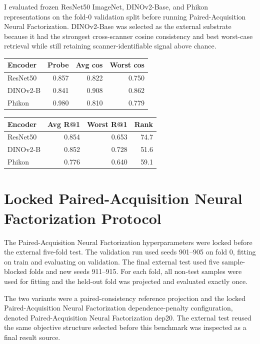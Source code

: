 \documentclass[10pt]{article}
\begin{document}
I evaluated frozen ResNet50 ImageNet, DINOv2-Base, and Phikon representations on the fold-0 validation split before running Paired-Acquisition Neural Factorization. DINOv2-Base was selected as the external substrate because it had the strongest cross-scanner cosine consistency and best worst-case retrieval while still retaining scanner-identifiable signal above chance.

\begin{center}
\begin{minipage}{0.98\linewidth}
\centering
{}
\label{tab:encoder-triage}
\small
\begin{tabular}{lrrr}
\toprule
Encoder & Probe & Avg cos & Worst cos \\
\midrule
ResNet50 & 0.857 & 0.822 & 0.750 \\
DINOv2-B & 0.841 & 0.908 & 0.862 \\
Phikon & 0.980 & 0.810 & 0.779 \\
\bottomrule
\end{tabular}

\vspace{0.25em}

\begin{tabular}{lrrr}
\toprule
Encoder & Avg R@1 & Worst R@1 & Rank \\
\midrule
ResNet50 & 0.854 & 0.653 & 74.7 \\
DINOv2-B & 0.852 & 0.728 & 51.6 \\
Phikon & 0.776 & 0.640 & 59.1 \\
\bottomrule
\end{tabular}
\end{minipage}
\end{center}

\section{Locked Paired-Acquisition Neural Factorization Protocol}

The Paired-Acquisition Neural Factorization hyperparameters were locked before the external five-fold test. The validation run used seeds 901--905 on fold 0, fitting on train and evaluating on validation. The final external test used five sample-blocked folds and new seeds 911--915. For each fold, all non-test samples were used for fitting and the held-out fold was projected and evaluated exactly once.

The two variants were a paired-consistency reference projection and the locked Paired-Acquisition Neural Factorization dependence-penalty configuration, denoted Paired-Acquisition Neural Factorization dep20. The external test reused the same objective structure selected before this benchmark was inspected as a final result source.
\end{document}
